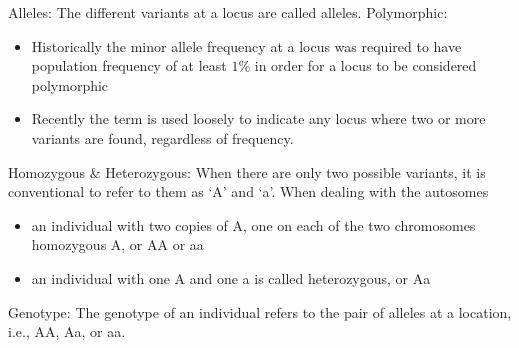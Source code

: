 \documentclass[a4paper,twoside,11pt]{article}
\begin{document}
\textcolor{NavyBlue}{Alleles: }The different variants at a locus are called alleles.
\newline
\newline
\textcolor{NavyBlue}{Polymorphic: }
\begin{itemize}
    \item Historically the minor allele frequency at a locus was required to have population frequency of at least $1\%$ in order for a locus to be considered polymorphic
    \item Recently the term is used loosely to indicate any locus where two or more variants are found, regardless of frequency.
\end{itemize}
\textcolor{NavyBlue}{Homozygous \& Heterozygous: }
\newline
When there are only two possible variants, it is conventional to refer to them as ‘A’ and ‘a’. When dealing with the autosomes
\begin{itemize}
    \item an individual with two copies of A, one on each of the two chromosomes homozygous A, or AA or aa 
    \item an individual with one A and one a is called heterozygous, or Aa 
\end{itemize}
\textcolor{NavyBlue}{Genotype: }The genotype of an individual refers to the pair of alleles at a location, i.e., AA, Aa, or aa. 
\end{document}
